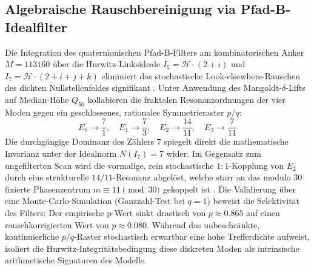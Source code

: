 
\subsection{Algebraische Rauschbereinigung via Pfad-B-Idealfilter}\label{sec:empirie-resonanz}
Die Integration des quaternionischen Pfad-B-Filters am kombinatorischen Anker $M = 113160$ über die Hurwitz-Linksideale $I_5 = \mathcal{H}\cdot(2+i)$ und $I_7 = \mathcal{H}\cdot(2+i+j+k)$ eliminiert das stochastische Look-elsewhere-Rauschen des dichten Nullstellenfeldes signifikant \cite{manuskript}. Unter Anwendung des Mangoldt-$\delta$-Lifts auf Median-Höhe $Q_{50}$ kollabieren die fraktalen Resonanzordnungen der vier Moden gegen ein geschlossenes, rationales Symmetrieraster $p/q$:
\begin{equation}
    E_0 \to \frac{7}{1}, \quad E_1 \to \frac{7}{3}, \quad E_2 \to \frac{14}{11}, \quad E_3 \to \frac{7}{11}
\end{equation}
Die durchgängige Dominanz des Zählers $7$ spiegelt direkt die mathematische Invarianz unter der Idealnorm $N(I_7) = 7$ wider. Im Gegensatz zum ungefilterten Scan wird die vormalige, rein stochastische $1:1$-Kopplung von $E_2$ durch eine strukturelle $14/11$-Resonanz abgelöst, welche starr an das modulo 30 fixierte Phasenzentrum $m \equiv 11 \pmod{30}$ gekoppelt ist \cite{manuskript}.
Die Validierung über eine Monte-Carlo-Simulation (Ganzzahl-Test bei $q=1$) beweist die Selektivität des Filters: Der empirische p-Wert sinkt drastisch von $p \approx 0.865$ auf einen rauschkorrigierten Wert von $p \approx 0.080$. Während das unbeschränkte, kontinuierliche $p/q$-Raster stochastisch erwartbar eine hohe Trefferdichte aufweist, isoliert die Hurwitz-Integritätsbedingung diese diskreten Moden als intrinsische arithmetische Signaturen des Modells.
